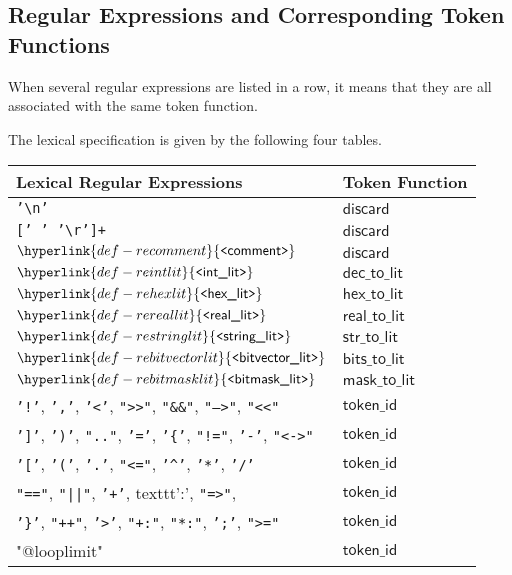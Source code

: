 \documentclass{book}
\newcommand\REintlit[0]{\hyperlink{def-reintlit}{\texttt{<}\textsf{int\_lit}\texttt{>}}}
\newcommand\REhexlit[0]{\hyperlink{def-rehexlit}{\texttt{<}\textsf{hex\_lit}\texttt{>}}}
\newcommand\REreallit[0]{\hyperlink{def-rereallit}{\texttt{<}\textsf{real\_lit}\texttt{>}}}
\newcommand\REstringlit[0]{\hyperlink{def-restringlit}{\texttt{<}\textsf{string\_lit}\texttt{>}}}
\newcommand\REbitvectorlit[0]{\hyperlink{def-rebitvectorlit}{\texttt{<}\textsf{bitvector\_lit}\texttt{>}}}
\newcommand\REbitmasklit[0]{\hyperlink{def-rebitmasklit}{\texttt{<}\textsf{bitmask\_lit}\texttt{>}}}
\newcommand\REcomment[0]{\hyperlink{def-recomment}{\texttt{<}\textsf{comment}\texttt{>}}}
\newcommand\discard[0]{\textsf{discard}}
\newcommand\decimaltolit[0]{\textsf{dec\_to\_lit}}
\newcommand\hextolit[0]{\textsf{hex\_to\_lit}}
\newcommand\realtolit[0]{\textsf{real\_to\_lit}}
\newcommand\strtolit[0]{\textsf{str\_to\_lit}}
\newcommand\bitstolit[0]{\textsf{bits\_to\_lit}}
\newcommand\masktolit[0]{\textsf{mask\_to\_lit}}
\newcommand\tokenid[0]{\textsf{token\_id}}
\begin{document}
\subsection{Regular Expressions and Corresponding Token Functions}
When several regular expressions are listed in a row, it means that they are all associated with the same
token function.

The lexical specification is given by the following four tables.

\begin{center}
\begin{tabular}{ll}
\textbf{Lexical Regular Expressions} & \textbf{Token Function}\\
\hline
\texttt{'\textbackslash n'}           & $\discard$ \\
\texttt{[' ' '\textbackslash r']+}    & $\discard$ \\
$\REcomment$                          & $\discard$ \\
$\REintlit$                           & $\decimaltolit$ \\
$\REhexlit$                           & $\hextolit$ \\
$\REreallit$                          & $\realtolit$ \\
$\REstringlit$                        & $\strtolit$ \\
$\REbitvectorlit$                     & $\bitstolit$ \\
$\REbitmasklit$                       & $\masktolit$ \\
\texttt{'!'}, \texttt{','}, \texttt{'<'}, \texttt{">>"}, \texttt{"\&\&"}, \texttt{"-->"}, \texttt{"<<"}                         & $\tokenid$  \\
\texttt{']'}, \texttt{')'}, \texttt{".."}, \texttt{'='}, \texttt{'\{'}, \texttt{"!="}, \texttt{'-'}, \texttt{"<->"}                        & $\tokenid$  \\
\texttt{'['}, \texttt{'('}, \texttt{'.'}, \texttt{"<="}, \texttt{'\textasciicircum'}, \texttt{'*'}, \texttt{'/'}                          & $\tokenid$  \\
\texttt{"=="}, \texttt{"||"}, \texttt{'+'}, texttt{':'}, \texttt{"=>"},                          & $\tokenid$  \\
\texttt{'\}'}, \texttt{"++"}, \texttt{'>'}, \texttt{"+:"}, \texttt{"*:"}, \texttt{';'}, \texttt{">="}                         & $\tokenid$  \\
"@looplimit"                          & $\tokenid$  \\
\hline
\end{tabular}
\end{center}
\end{document}
